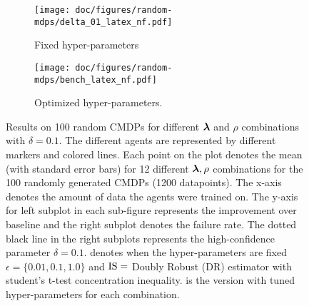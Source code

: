 \begin{figure}[t]
\centering
\begin{subfigure}[b]{0.7\textwidth}
    \texttt{[image: doc/figures/random-mdps/delta\_01\_latex\_nf.pdf]}
    \caption{Fixed hyper-parameters}
    \label{fig:delta-params-mean} 
\end{subfigure}
\hfill
\begin{subfigure}[b]{0.7\textwidth}
    \texttt{[image: doc/figures/random-mdps/bench\_latex\_nf.pdf]}
    \caption{Optimized hyper-parameters.}
    \label{fig:best-params-mean}
\end{subfigure}
\caption[]{
\small
Results on 100 random CMDPs for different $\bm{\lambda}$ and $\rho$ combinations with $\delta=0.1$. The different agents are represented by different markers and colored lines. Each point on the plot denotes the mean (with standard error bars) for 12 different $\bm{\lambda},\rho$ combinations for the 100 randomly generated CMDPs (1200 datapoints). 
The x-axis denotes the amount of data the agents were trained on. 
The y-axis for left subplot in each sub-figure represents the improvement over baseline and the right subplot denotes the failure rate. The dotted black line in the right subplots represents the high-confidence parameter $\delta=0.1$.
 denotes when the hyper-parameters are fixed $\epsilon=\{0.01, 0.1, 1.0\}$ and $\text{IS}=$ Doubly Robust (DR) estimator with student's t-test concentration inequality. 
 is the version with tuned hyper-parameters for each combination.
\label{fig:cmdp-combined-results}}
\vskip -0.1in
\end{figure}


